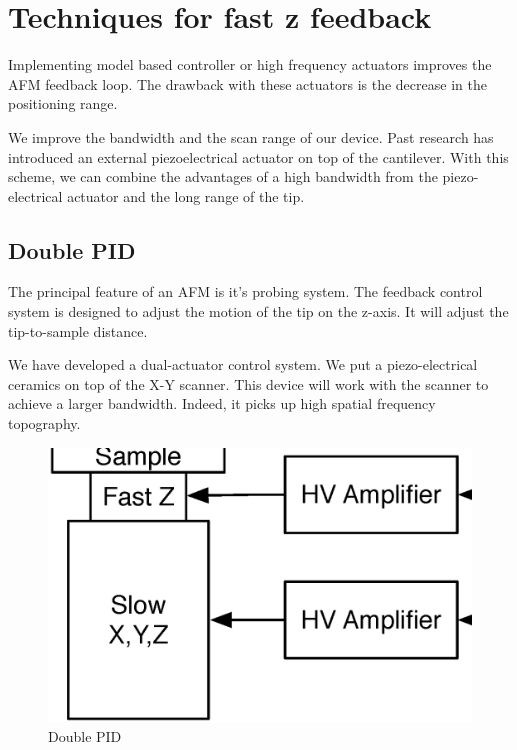 \chapter{Techniques for fast z feedback}

Implementing model based controller or high frequency actuators improves the AFM feedback loop\cite{sulchek1999dual}. The drawback with these actuators is the decrease in the positioning range.

We improve the bandwidth and the scan range of our device. Past research has introduced an external piezoelectrical actuator on top of the cantilever. With this scheme, we can combine the advantages of a high bandwidth from the piezo-electrical actuator and the long range of the tip.

\section{Double PID}

The principal feature of an AFM is it's probing system. \cite{jeong:093706} The feedback control system is designed to adjust the motion of the tip on the z-axis. It will adjust the tip-to-sample distance. 

We have developed a dual-actuator control system. We put a piezo-electrical ceramics on top of the X-Y scanner. This device will work with the scanner to achieve a larger bandwidth. Indeed, it picks up high spatial frequency topography. 

\begin{figure}[H]
  \centering
  \includegraphics[scale=0.3]{images/doublePID.eps}
    \caption{Double PID}
  \label{DoublePid}
\end{figure}

